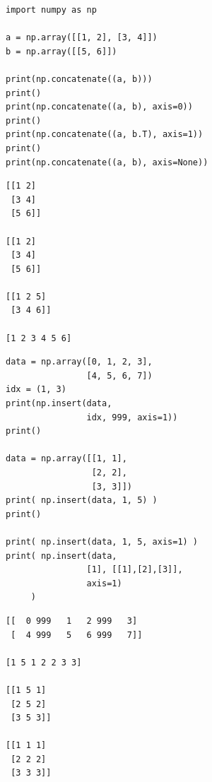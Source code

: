 \begin{frame}[fragile]
%
\begin{tcbraster}[raster columns=2,
                  raster equal height,
                  nobeforeafter,
                  raster column skip=0.2cm]
\begin{codebox}
\begin{verbatim}
import numpy as np

a = np.array([[1, 2], [3, 4]])
b = np.array([[5, 6]])

print(np.concatenate((a, b)))
print()
print(np.concatenate((a, b), axis=0))
print()
print(np.concatenate((a, b.T), axis=1))
print()
print(np.concatenate((a, b), axis=None))
\end{verbatim}
\end{codebox}
%
\begin{cmdbox}
\begin{verbatim}
[[1 2]
 [3 4]
 [5 6]]
 
[[1 2]
 [3 4]
 [5 6]]

[[1 2 5]
 [3 4 6]]

[1 2 3 4 5 6]
\end{verbatim}
\end{cmdbox}
\end{tcbraster}
%
\end{frame}


\begin{frame}[fragile]
%
\begin{tcbraster}[raster columns=2,
                  raster equal height,
                  nobeforeafter,
                  raster column skip=0.2cm]
\begin{codebox}
\begin{verbatim}
data = np.array([0, 1, 2, 3],
                [4, 5, 6, 7])
idx = (1, 3)
print(np.insert(data, 
                idx, 999, axis=1))
print()

data = np.array([[1, 1],
                 [2, 2],
                 [3, 3]])
print( np.insert(data, 1, 5) )
print()

print( np.insert(data, 1, 5, axis=1) )
print( np.insert(data,
                [1], [[1],[2],[3]],
                axis=1)
     )
\end{verbatim}
\end{codebox}
%
\begin{cmdbox}
\begin{verbatim}
[[  0 999   1   2 999   3]
 [  4 999   5   6 999   7]]
 
[1 5 1 2 2 3 3]

[[1 5 1]
 [2 5 2]
 [3 5 3]]
 
[[1 1 1]
 [2 2 2]
 [3 3 3]]
\end{verbatim}
\end{cmdbox}
\end{tcbraster}
%
\end{frame}


